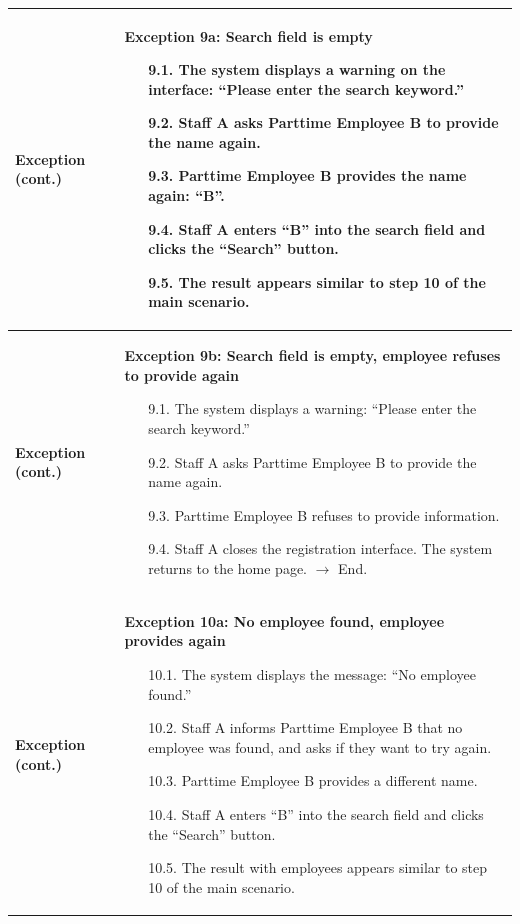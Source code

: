 \begin{longtable}{|p{3cm}|p{13cm}|}
\textbf{Exception (cont.)} &
\textbf{Exception 9a: Search field is empty}
\begin{enumerate}
    \item[9.1.] The system displays a warning on the interface: ``Please enter the search keyword.''
    \item[9.2.] Staff A asks Parttime Employee B to provide the name again.
    \item[9.3.] Parttime Employee B provides the name again: ``B''.
    \item[9.4.] Staff A enters ``B'' into the search field and clicks the ``Search'' button.
    \item[9.5.] The result appears similar to step 10 of the main scenario.
\end{enumerate} \\
\hline

\textbf{Exception (cont.)} &
\textbf{Exception 9b: Search field is empty, employee refuses to provide again}
\begin{enumerate}
    \item[9.1.] The system displays a warning: ``Please enter the search keyword.''
    \item[9.2.] Staff A asks Parttime Employee B to provide the name again.
    \item[9.3.] Parttime Employee B refuses to provide information.
    \item[9.4.] Staff A closes the registration interface. The system returns to the home page. $\rightarrow$ End.
\end{enumerate} \\
\hline

\textbf{Exception (cont.)} &
\textbf{Exception 10a: No employee found, employee provides again}
\begin{enumerate}
    \item[10.1.] The system displays the message: ``No employee found.''
    \item[10.2.] Staff A informs Parttime Employee B that no employee was found, and asks if they want to try again.
    \item[10.3.] Parttime Employee B provides a different name.
    \item[10.4.] Staff A enters ``B'' into the search field and clicks the ``Search'' button.
    \item[10.5.] The result with employees appears similar to step 10 of the main scenario.
\end{enumerate} \\
\hline


\end{longtable}
